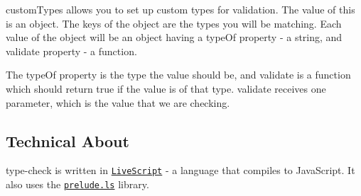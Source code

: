 {\ttfamily custom\+Types} allows you to set up custom types for validation. The value of this is an object. The keys of the object are the types you will be matching. Each value of the object will be an object having a {\ttfamily type\+Of} property -\/ a string, and {\ttfamily validate} property -\/ a function.

The {\ttfamily type\+Of} property is the type the value should be, and {\ttfamily validate} is a function which should return true if the value is of that type. {\ttfamily validate} receives one parameter, which is the value that we are checking.

\subsection*{Technical About}

{\ttfamily type-\/check} is written in \href{http://livescript.net/}{\tt Live\+Script} -\/ a language that compiles to Java\+Script. It also uses the \href{http://preludels.com/}{\tt prelude.\+ls} library. 